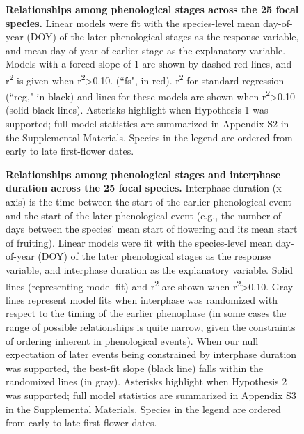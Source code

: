 \documentclass{article}
\begin{document}
 \begin{figure}[ht]
 \centering
 \caption{\textbf{Relationships among phenological stages across the 25 focal species.} Linear models were fit with the species-level mean day-of-year (DOY) of the later phenological stages as the response variable, and mean day-of-year of earlier stage as the explanatory variable. Models with a forced slope of 1 are shown by dashed red lines, and r\textsuperscript{2} is given when r\textsuperscript{2}>0.10. (``fs", in red). r\textsuperscript{2} for standard regression (``reg," in black) and lines for these models are shown when r\textsuperscript{2}>0.10 (solid black lines). Asterisks highlight when Hypothesis 1 was supported; full model statistics are summarized in Appendix S2 in the Supplemental Materials. Species in the legend are ordered from early to late first-flower dates.} 
 \label{fig:latevearly}
\end{figure}
\begin{figure}[ht]
 \centering
 \caption{\textbf{Relationships among phenological stages and interphase duration across the 25 focal species.} Interphase duration (x-axis) is the time between the start of the earlier phenological event and the start of the later phenological event (e.g., the number of days between the species' mean start of flowering and its mean start of fruiting). Linear models were fit with the species-level mean day-of-year (DOY) of the later phenological stages as the response variable, and interphase duration as the explanatory variable. Solid lines (representing model fit) and r\textsuperscript{2} are shown when r\textsuperscript{2}>0.10. Gray lines represent model fits when interphase was randomized with respect to the timing of the earlier phenophase (in some cases the range of possible relationships is quite narrow, given the constraints of ordering inherent in phenological events). When our null expectation of later events being constrained by interphase duration was supported, the best-fit slope (black line) falls within the randomized lines (in gray). Asterisks highlight when Hypothesis 2 was supported; full model statistics are summarized in Appendix S3 in the Supplemental Materials. Species in the legend are ordered from early to late first-flower dates.}
 \label{fig:inter}
 \end{figure}

\end{document}

